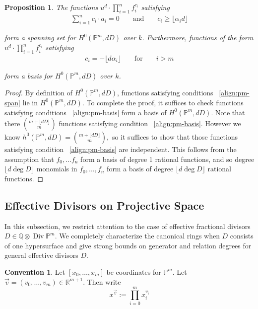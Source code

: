 \documentclass{amsart}
\theoremstyle{plain}
\newtheorem{prop}[thm]{Proposition}
\theoremstyle{definition}
\newtheorem{convention}[thm]{Convention}
\theoremstyle{remark}
\numberwithin{equation}{section}
\newcommand\ssec{\subsection}
\newcommand\br{{\mathbb R}}
\newcommand\bq{{\mathbb Q}}
\newcommand\bp{{\mathbb P}}
\DeclareMathOperator\di{Div}
\newcommand\bida{a}
\begin{document}
\begin{prop}
\label{prop:pm-span-and-basis}
The functions $u^d \cdot \prod_{i=1}^n f_i^{c_i}$ satisfying
\begin{align}
\label{align:pm-span}
\sum_{i=1}^{n} c_i \cdot \bida_i = 0 && \text{ and } &&c_i \geq \lfloor \alpha_i d\rfloor	
\end{align}

\noindent
form a spanning set for $H^0(\bp^m, dD)$ over $k$. Furthermore, functions 
of the form $u^d \cdot \prod_{i=1}^n f_i^{c_i}$ satisfying
\begin{align}
\label{align:pm-basis}
c_i = -\lfloor d\alpha_i \rfloor && \text{ for } && i > m
\end{align}

\noindent
form a basis for $H^0(\bp^m, dD)$ over $k$.
\end{prop}

\begin{proof}
By definition of $H^0(\bp^m,dD)$, functions satisfying conditions 
~\eqref{align:pm-span} lie in $H^0(\bp^m,dD)$. To complete the proof, it suffices to check functions satisfying conditions ~\eqref{align:pm-basis} form a basis of $H^0(\bp^m,dD)$. Note that there $\binom{m+ \lfloor dD \rfloor }{m}$ functions satisfying condition ~\eqref{align:pm-basis}. However we know $h^0(\bp^m,dD) = \binom{m+ \lfloor dD \rfloor }{m},$ so it suffices to show that those functions satisfying condition ~\eqref{align:pm-basis} are independent. This follows from the assumption that $f_0,\ldots f_n$ form a basis of degree 1 rational functions, and so degree $\lfloor d \deg D \rfloor $ monomials in $f_0,\ldots, f_n$ form a basis of degree $\lfloor d \deg D \rfloor $ rational functions.
\end{proof}

\ssec{Effective Divisors on Projective Space}
\label{ssec:proj-one-point}

In this subsection, we restrict attention to the case of effective
fractional divisors $D \in \bq \otimes \di \bp^m$. We completely
characterize the canonical rings when $D$ consists of one
hypersurface and give strong bounds on generator and relation
degrees for general effective divisors $D$.

\begin{convention}
Let $[x_0, \ldots, x_m]$ be coordinates for $\bp^m$. Let
$\vec{v} = (v_0, \ldots, v_m) \in \br^{m + 1}$. Then write
\[
	x^{\vec{v}} := \prod_{i = 0}^{m} x_i^{v_i}
\]
\end{convention}
\end{document}
